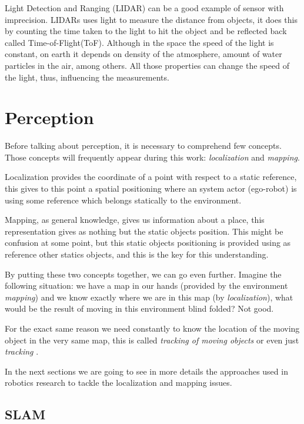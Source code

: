 Light Detection and Ranging (LIDAR) can be a good example of sensor with imprecision. LIDARs uses light to measure the distance from objects, it does this by counting the time taken to the light to hit the object and be reflected back called Time-of-Flight(ToF). Although in the space the speed of the light is constant, on earth it depends on density of the atmosphere, amount of water particles in the air, among others. All those properties can change the speed of the light, thus, influencing the measurements.

\section{Perception}

Before talking about perception, it is necessary to comprehend few concepts. Those concepts will frequently appear during this work: \textit{localization} and \textit{mapping}.

Localization provides the coordinate of a point with respect to a static reference, this gives to this point a spatial positioning where an system actor (ego-robot) is using some reference which belongs statically to the environment.  

Mapping, as general knowledge, gives us information about a place, this representation gives as nothing but the static objects position. This might be confusion at some point, but this static objects positioning is provided using as reference other statics objects, and this is the key for this understanding.

By putting these two concepts together, we can go even further. Imagine the following situation: we have a map in our hands (provided by the environment \textit{mapping}) and we know exactly where we are in this map (by \textit{localization}), what would be the result of moving in this environment blind folded? Not good.

For the exact same reason we need constantly to know the location of the moving object in the very same map, this is called \textit{tracking of moving objects} or even just \textit{tracking} \cite{Wang04a}.

In the next sections we are going to see in more details the approaches used in robotics research to tackle the localization and mapping issues.

\subsection{SLAM}

